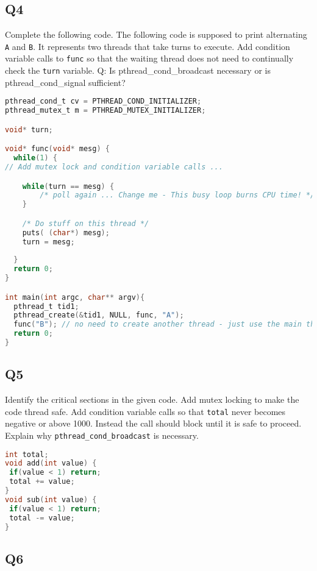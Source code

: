\subsection{Q4}\label{q4}

Complete the following code. The following code is supposed to print alternating \texttt{A} and \texttt{B}. It represents two threads that take turns to execute. Add condition variable calls to \texttt{func} so that the waiting thread does not need to continually check the \texttt{turn} variable. Q: Is pthread\_cond\_broadcast necessary or is pthread\_cond\_signal sufficient?

\begin{lstlisting}[language=C]
pthread_cond_t cv = PTHREAD_COND_INITIALIZER;
pthread_mutex_t m = PTHREAD_MUTEX_INITIALIZER;

void* turn;

void* func(void* mesg) {
  while(1) {
// Add mutex lock and condition variable calls ...

    while(turn == mesg) { 
        /* poll again ... Change me - This busy loop burns CPU time! */ 
    }

    /* Do stuff on this thread */
    puts( (char*) mesg);
    turn = mesg;
    
  }
  return 0;
}

int main(int argc, char** argv){
  pthread_t tid1;
  pthread_create(&tid1, NULL, func, "A");
  func("B"); // no need to create another thread - just use the main thread
  return 0;
}
\end{lstlisting}

\subsection{Q5}\label{q5}

Identify the critical sections in the given code. Add mutex locking to make the code thread safe. Add condition variable calls so that \texttt{total} never becomes negative or above 1000. Instead the call should block until it is safe to proceed. Explain why \texttt{pthread\_cond\_broadcast} is necessary.

\begin{lstlisting}[language=C]
int total;
void add(int value) {
 if(value < 1) return;
 total += value;
}
void sub(int value) {
 if(value < 1) return;
 total -= value;
}
\end{lstlisting}

\subsection{Q6}\label{q6}

